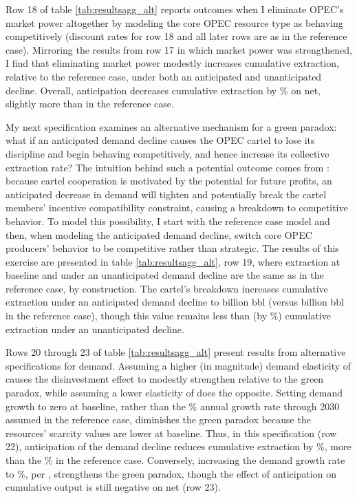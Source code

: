 \documentclass[12pt]{article}
\begin{document}
Row 18 of table \ref{tab:resultsagg_alt} reports outcomes when I eliminate OPEC's market power altogether by modeling the core OPEC resource type as behaving competitively (discount rates for row 18 and all later rows are as in the reference case). Mirroring the results from row 17 in which market power was strengthened, I find that eliminating market power modestly increases cumulative extraction, relative to the reference case, under both an anticipated and unanticipated decline. Overall, anticipation decreases cumulative extraction by \unskip\% on net, slightly more than in the reference case.

My next specification examines an alternative mechanism for a green paradox: what if an anticipated demand decline causes the OPEC cartel to lose its discipline and begin behaving competitively, and hence increase its collective extraction rate? The intuition behind such a potential outcome comes from \citet{rotembergsaloner1986}: because cartel cooperation is motivated by the potential for future profits, an anticipated decrease in demand will tighten and potentially break the cartel members' incentive compatibility constraint, causing a breakdown to competitive behavior. To model this possibility, I start with the reference case model and then, when modeling the anticipated demand decline, switch core OPEC producers' behavior to be competitive rather than strategic. The results of this exercise are presented in table \ref{tab:resultsagg_alt}, row 19, where extraction at baseline and under an unanticipated demand decline are the same as in the reference case, by construction. The cartel's breakdown increases cumulative extraction under an anticipated demand decline to billion bbl (versus billion bbl in the reference case), though this value remains less than (by \unskip\%) cumulative extraction under an unanticipated decline.

Rows 20 through 23 of table \ref{tab:resultsagg_alt} present results from alternative specifications for demand. Assuming a higher (in magnitude) demand elasticity of causes the disinvestment effect to modestly strengthen relative to the green paradox, while assuming a lower elasticity of does the opposite. Setting demand growth to zero at baseline, rather than the \unskip\% annual growth rate through 2030 assumed in the reference case, diminishes the green paradox because the resources' scarcity values are lower at baseline. Thus, in this specification (row 22), anticipation of the demand decline reduces cumulative extraction by \unskip\%, more than the \unskip\% in the reference case. Conversely, increasing the demand growth rate to \unskip\%, per \cite{OPECforecast2023}, strengthens the green paradox, though the effect of anticipation on cumulative output is still negative on net (row 23).
\end{document}
